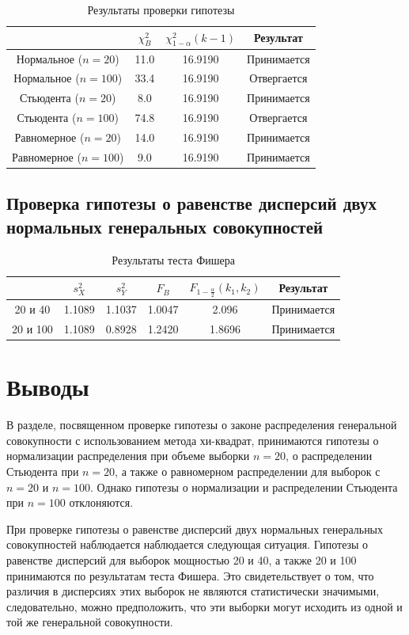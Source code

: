 \documentclass[12pt,a4paper]{article}
\begin{document}
		\begin{table}[htbp]
			\centering
			\begin{tabular}{ |c|c|c|c| }
				\hline
				& \( \chi_B^2 \) & \( \chi_{1 - \alpha}^2 (k - 1) \) & Результат \\
				\hline
				Нормальное (\( n=20 \)) & 11.0 & 16.9190 & Принимается \\
				\hline
				Нормальное (\( n=100 \)) & 33.4 & 16.9190 & Отвергается \\
				\hline
				Стьюдента (\( n=20 \)) & 8.0 & 16.9190 & Принимается \\
				\hline
				Стьюдента (\( n=100 \)) & 74.8 & 16.9190 & Отвергается \\
				\hline
				Равномерное (\( n=20 \)) & 14.0 & 16.9190 & Принимается \\
				\hline
				Равномерное (\( n=100 \)) & 9.0 & 16.9190 & Принимается \\
				\hline
			\end{tabular}
			\caption{Результаты проверки гипотезы}
		\end{table}

		\subsection{Проверка гипотезы о равенстве дисперсий двух нормальных
			генеральных совокупностей}

		\begin{table}[htbp]
			\centering
			\begin{tabular}{ |c|c|c|c|c|c| }
				\hline
				& \( s_X^2 \) & \( s_Y^2 \) & \( F_B \)
				& \(F_{1 - \frac{\alpha}{2}} (k_1, k_2) \) & Результат \\
				\hline
				20 и 40 & 1.1089 & 1.1037 & 1.0047 & 2.096 & Принимается \\ \hline
				20 и 100 & 1.1089 & 0.8928 & 1.2420 & 1.8696 & Принимается \\ \hline
			\end{tabular}
			\caption{Результаты теста Фишера}
		\end{table}

		\section{Выводы}

		В разделе, посвященном проверке гипотезы о законе распределения
		генеральной совокупности с использованием метода хи-квадрат,
		принимаются гипотезы о нормализации распределения при объеме
		выборки \( n=20 \), о распределении Стьюдента при \( n=20 \), а также о
		равномерном распределении для выборок с \( n=20 \) и \( n=100 \). Однако
		гипотезы о нормализации и распределении Стьюдента при \( n=100 \)
		отклоняются.

		При проверке гипотезы о равенстве дисперсий двух нормальных
		генеральных совокупностей наблюдается наблюдается следующая ситуация.
		Гипотезы о равенстве дисперсий для выборок мощностью 20 и 40, а также
		20 и 100 принимаются по результатам теста Фишера. Это свидетельствует
		о том, что различия в дисперсиях этих выборок не являются
		статистически значимыми, следовательно, можно предположить, что эти
		выборки могут исходить из одной и той же генеральной совокупности.
\end{document}

